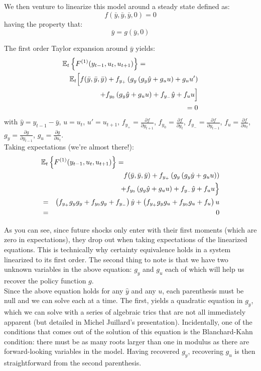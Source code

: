 We then venture to linearize this model around a steady state defined as:
\[
f(\bar y, \bar y, \bar y, 0) = 0
\]
having the property that:
\[
\bar y = g(\bar y, 0)
\]

The first order Taylor expansion around $\bar y$ yields:
\begin{eqnarray*}
\lefteqn{\mathbb{E}_t\left\{F^{(1)}(y_{t-1},u_t,u_{t+1})\right\} =}\\
&& \mathbb{E}_t\Big[f(\bar y, \bar y, \bar y)+f_{y_+}\left(g_y\left(g_y\hat y+g_uu \right)+g_u u' \right)\\
&& + f_{y_0}\left(g_y\hat y+g_uu \right)+f_{y_-}\hat y+f_u u\Big]\\
&& = 0
\end{eqnarray*}
with $\hat y = y_{t-1} - \bar y$, $u=u_t$, $u'=u_{t+1}$, $f_{y_+}=\frac{\partial f}{\partial y_{t+1}}$, $f_{y_0}=\frac{\partial f}{\partial y_t}$, $f_{y_-}=\frac{\partial f}{\partial y_{t-1}}$, $f_{u}=\frac{\partial f}{\partial u_t}$, $g_y=\frac{\partial g}{\partial y_{t-1}}$, $g_u=\frac{\partial g}{\partial u_t}$.\\

Taking expectations (we're almost there!):
\begin{eqnarray*}
   \lefteqn{\mathbb{E}_t\left\{F^{(1)}(y_{t-1},u_t, u_{t+1})\right\} =}\\
&& f(\bar y, \bar y, \bar y)+f_{y_+}\left(g_y\left(g_y\hat y+g_uu \right) \right)\\
&& + f_{y_0}\left(g_y\hat y+g_uu \right)+f_{y_-}\hat y+f_u u\Big\}\\
&=& \left(f_{y_+}g_yg_y+f_{y_0}g_y+f_{y_-}\right)\hat y+\left(f_{y_+}g_yg_u+f_{y_0}g_u+f_{u}\right)u\\
&=& 0\\
\end{eqnarray*}

As you can see, since future shocks only enter with their first moments (which are zero in expectations), they drop out when taking expectations of the linearized equations. This is technically why certainty equivalence holds in a system linearized to its first order. The second thing to note is that we have two unknown variables in the above equation: $g_y$ and $g_u$ each of which will help us recover the policy function $g$. \\

Since the above equation holds for any $\hat y$ and any $u$, each parenthesis must be null and we can solve each at a time. The first, yields a quadratic equation  in $g_y$, which we can solve with a series of algebraic trics that are not all immediately apparent (but detailed in Michel Juillard's presentation). Incidentally, one of the conditions that comes out of the solution of this equation is the Blanchard-Kahn condition: there must be as many roots larger than one in modulus as there are forward-looking variables in the model. Having recovered $g_y$, recovering $g_u$ is then straightforward from the second parenthesis. \\

